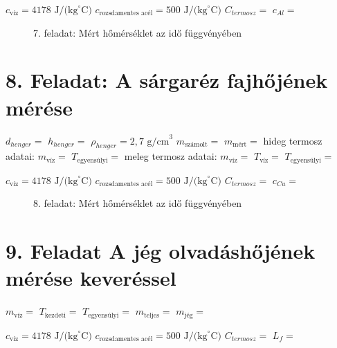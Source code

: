\documentclass{article}
\begin{document}
$c_{\text{víz}}= 4178 \text{ J/(kg}^{\circ}\text{C)}$   %
$c_{\text{rozsdamentes acél}}=500 \text{ J/(kg}^{\circ}\text{C)}$
$C_{termosz}=$
$c_{Al}=$

\begin{figure}[H]
    \centering
    \caption*{7. feladat: Mért hőmérséklet az idő függvényében}
    \label{}
\end{figure}

\section*{8. Feladat: A sárgaréz fajhőjének mérése}

$d_{henger}=$
$h_{henger}=$
$\rho_{henger}=2,7 \text{ g/cm}^3$
$m_{\text{számolt}}=$
$m_{\text{mért}}=$
hideg termosz adatai:
$m_{\text{víz}}=$
$T_{\text{egyensúlyi}}=$
meleg termosz adatai:
$m_{\text{víz}}=$
$T_{\text{víz}}=$
$T_{\text{egyensúlyi}}=$

$c_{\text{víz}}= 4178 \text{ J/(kg}^{\circ}\text{C)}$   %
$c_{\text{rozsdamentes acél}}=500 \text{ J/(kg}^{\circ}\text{C)}$
$C_{termosz}=$
$c_{Cu}=$

\begin{figure}[H]
    \centering
    \caption*{8. feladat: Mért hőmérséklet az idő függvényében}
    \label{}
\end{figure}

\section*{9. Feladat A jég olvadáshőjének mérése keveréssel}

$m_{\text{víz}}=$ 
$T_{\text{kezdeti}}=$ 
$T_{\text{egyensúlyi}}=$ 
$m_{\text{teljes}}=$ 
$m_{\text{jég}}=$

$c_{\text{víz}}= 4178 \text{ J/(kg}^{\circ}\text{C)}$   %
$c_{\text{rozsdamentes acél}}=500 \text{ J/(kg}^{\circ}\text{C)}$
$C_{termosz}=$
$L_{f}=$ 
\end{document}
